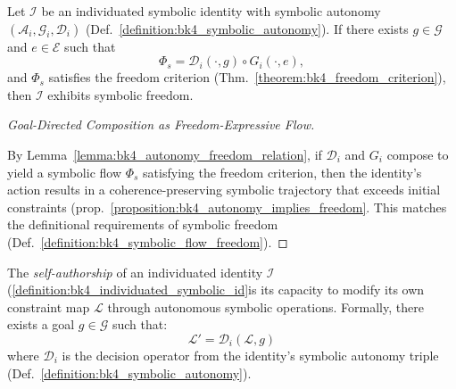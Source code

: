 \begin{proposition}
\label{proposition:bk4_autonomy_implies_freedom}
Let $\mathcal{I}$ be an individuated symbolic identity with symbolic autonomy $(\mathcal{A}_i, \mathcal{G}_i, \mathcal{D}_i)$ (Def.~\ref{definition:bk4_symbolic_autonomy}). If there exists $g \in \mathcal{G}$ and $e \in \mathcal{E}$ such that
\[
\Phi_s = \mathcal{D}_i(\cdot, g) \circ G_i(\cdot, e),
\]
and $\Phi_s$ satisfies the freedom criterion (Thm.~\ref{theorem:bk4_freedom_criterion}), then $\mathcal{I}$ exhibits symbolic freedom.
\end{proposition}
\begin{proof}[Goal-Directed Composition as Freedom-Expressive Flow]
\label{proof:bk4_goal_directed_composition_flow}
\leavevmode

By Lemma~\ref{lemma:bk4_autonomy_freedom_relation}, if $\mathcal{D}_i$ and $G_i$ compose to yield a symbolic flow $\Phi_s$ satisfying the freedom criterion, then the identity's action results in a coherence-preserving symbolic trajectory that exceeds initial constraints (prop.~\ref{proposition:bk4_autonomy_implies_freedom}. This matches the definitional requirements of symbolic freedom (Def.~\ref{definition:bk4_symbolic_flow_freedom}).
\end{proof}

\begin{definition}
\label{definition:bk4_self_authorship}
The \emph{self-authorship} of an individuated identity $\mathcal{I}$ (\ref{definition:bk4_individuated_symbolic_id}is its capacity to modify its own constraint map $\mathcal{L}$ through autonomous symbolic operations. Formally, there exists a goal $g \in \mathcal{G}$ such that:
\[
\mathcal{L}' = \mathcal{D}_i(\mathcal{L}, g)
\]
where $\mathcal{D}_i$ is the decision operator from the identity's symbolic autonomy triple (Def.~\ref{definition:bk4_symbolic_autonomy}).
\end{definition}

